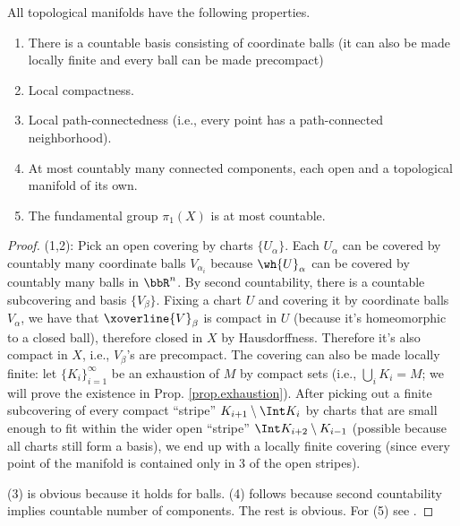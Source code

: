 \begin{thm} All topological manifolds have the following properties.
\begin{enumerate}[label=(\alph*)]
    \item There is a countable basis consisting of coordinate balls (it can also be made locally finite and every ball can be made precompact)
    \item Local compactness.
    \item Local path-connectedness (i.e., every point has a path-connected neighborhood).
    \item At most countably many connected components, each open and a topological manifold of its own.
    \item The fundamental group $\pi_1(X)$ is at most countable.
\end{enumerate}
\end{thm}
\begin{proof}
    (1,2): Pick an open covering by charts $\{U_\alpha\}$. Each $U_\alpha $ can be covered by countably many coordinate balls $V_{\alpha_i}$ because $\wh{U}_\alpha$ can be covered by countably many balls in $\bbR^n$. By second countability, there is a countable subcovering and basis $\{V_\beta\}$. Fixing a chart $U$ and covering it by coordinate balls $V_\alpha$, we have that $\xoverline{V}_\beta$ is compact in $U$ (because it's homeomorphic to a closed ball), therefore closed in $X$ by Hausdorffness. Therefore it's also compact in $X$, i.e., $V_\beta$'s are precompact. The covering can also be made locally finite: let $\{K_i\}_{i=1}^\infty$ be an exhaustion of $M$ by compact sets (i.e., $\bigcup_i K_i=M$; we will prove the existence in Prop. \ref{prop.exhaustion}). After picking out a finite subcovering of every compact ``stripe'' $K_{i+1}\setminus \Int K_{i}$ by charts that are small enough to fit within the wider open ``stripe'' $\Int K_{i+2}\setminus K_{i-1}$ (possible because all charts still form a basis), we end up with a locally finite covering (since every point of the manifold is contained only in 3 of the open stripes).

    (3) is obvious because it holds for balls. (4) follows because second countability implies countable number of components. The rest is obvious. For (5) see \cite[Thm.~1.16]{Lee}.
\end{proof}

